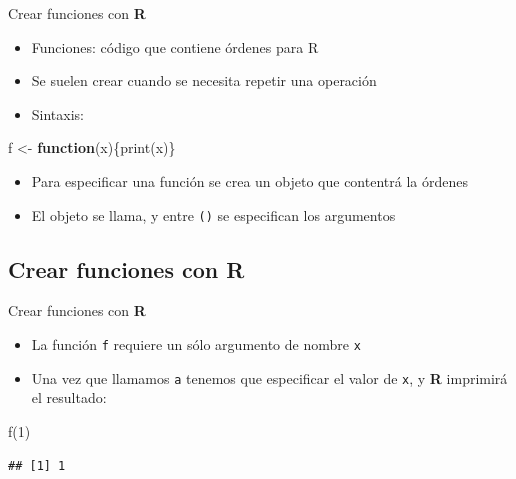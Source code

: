 \documentclass[
  11pt,
  ignorenonframetext,
]{beamer}
\newenvironment{Shaded}{}{}
\newcommand{\ControlFlowTok}[1]{\textcolor[rgb]{0.00,0.44,0.13}{\textbf{#1}}}
\newcommand{\DecValTok}[1]{\textcolor[rgb]{0.25,0.63,0.44}{#1}}
\newcommand{\FunctionTok}[1]{\textcolor[rgb]{0.02,0.16,0.49}{#1}}
\newcommand{\NormalTok}[1]{#1}
\newcommand{\OtherTok}[1]{\textcolor[rgb]{0.00,0.44,0.13}{#1}}
\begin{document}
\begin{frame}[fragile]{Crear funciones con \textbf{R}}
\begin{itemize}
\item
  Funciones: código que contiene órdenes para R
\item
  Se suelen crear cuando se necesita repetir una operación
\item
  Sintaxis:
\end{itemize}

\begin{Shaded}
\begin{Highlighting}[]
\NormalTok{f }\OtherTok{\textless{}{-}} \ControlFlowTok{function}\NormalTok{(x)\{}\FunctionTok{print}\NormalTok{(x)\}}
\end{Highlighting}
\end{Shaded}

\begin{itemize}
\item
  Para especificar una función se crea un objeto que contentrá la
  órdenes
\item
  El objeto se llama, y entre \texttt{()} se especifican los argumentos
\end{itemize}
\end{frame}

\hypertarget{crear-funciones-con-r-1}{%
\subsection{\texorpdfstring{Crear funciones con
\textbf{R}}{Crear funciones con R}}\label{crear-funciones-con-r-1}}

\begin{frame}[fragile]{Crear funciones con \textbf{R}}
\begin{itemize}
\item
  La función \texttt{f} requiere un sólo argumento de nombre \texttt{x}
\item
  Una vez que llamamos \texttt{a} tenemos que especificar el valor de
  \texttt{x}, y \textbf{R} imprimirá el resultado:
\end{itemize}

\begin{Shaded}
\begin{Highlighting}[]
\FunctionTok{f}\NormalTok{(}\DecValTok{1}\NormalTok{)}
\end{Highlighting}
\end{Shaded}

\begin{verbatim}
## [1] 1
\end{verbatim}
\end{frame}
\end{document}
